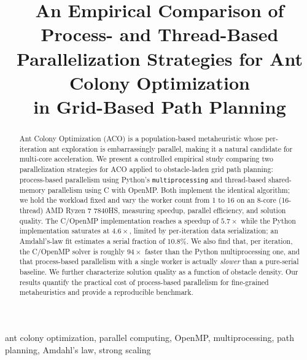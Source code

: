 \documentclass[conference]{IEEEtran}
\begin{document}
\title{An Empirical Comparison of Process- and Thread-Based\\
Parallelization Strategies for Ant Colony Optimization\\
in Grid-Based Path Planning}

\author{
}

\maketitle

\begin{abstract}
Ant Colony Optimization (ACO) is a population-based metaheuristic whose
per-iteration ant exploration is embarrassingly parallel, making it a natural
candidate for multi-core acceleration. We present a controlled empirical study
comparing two parallelization strategies for ACO applied to obstacle-laden grid
path planning: process-based parallelism using Python's \texttt{multiprocessing}
and thread-based shared-memory parallelism using C with OpenMP. Both implement
the identical algorithm; we hold the workload fixed and vary the worker count
from 1 to 16 on an 8-core (16-thread) AMD Ryzen 7 7840HS, measuring speedup,
parallel efficiency, and solution quality. The C/OpenMP implementation reaches a
speedup of $5.7\times$ while the Python implementation saturates at $4.6\times$,
limited by per-iteration data serialization; an Amdahl's-law fit estimates a
serial fraction of $10.8\%$. We also find that, per iteration, the C/OpenMP
solver is roughly $94\times$ faster than the Python multiprocessing one, and that
process-based parallelism with a single worker is actually \emph{slower} than a
pure-serial baseline. We further characterize solution quality as a function of
obstacle density. Our results quantify the practical cost of process-based
parallelism for fine-grained metaheuristics and provide a reproducible benchmark.
\end{abstract}

\begin{IEEEkeywords}
ant colony optimization, parallel computing, OpenMP, multiprocessing,
path planning, Amdahl's law, strong scaling
\end{IEEEkeywords}
\end{document}
